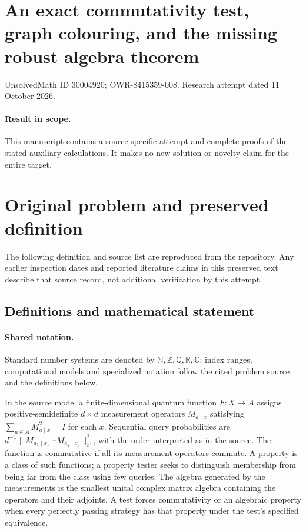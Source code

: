 \documentclass[11pt]{article}
\begin{document}
\section*{An exact commutativity test, graph colouring, and the missing robust algebra theorem}
\noindent UnsolvedMath ID 30004920; OWR-8415359-008. Research attempt dated 11 October 2026.
\paragraph{Result in scope.}This manuscript contains a source-specific attempt and complete proofs of the stated auxiliary calculations. It makes no new solution or novelty claim for the entire target.
\section{Original problem and preserved definition}
The following definition and source list are reproduced from the repository. Any earlier inspection dates and reported literature claims in this preserved text describe that source record, not additional verification by this attempt.
\subsection{Definitions and mathematical statement}

\paragraph{Shared notation.}Standard number systems are denoted by $\mathbb N,\mathbb Z,\mathbb Q,\mathbb R,\mathbb C$; index ranges, computational models and specialized notation follow the cited problem source and the definitions below.


In the source model a finite-dimensional quantum function $F:X\to A$ assigns positive-semidefinite $d\times d$ measurement operators $M_{a\mid x}$ satisfying $\sum_{a\in A}M_{a\mid x}^2=I$ for each $x$. Sequential query probabilities are $d^{-1}\|M_{a_1\mid x_1}\cdots M_{a_q\mid x_q}\|_{\mathrm F}^2$, with the order interpreted as in the source. The function is commutative if all its measurement operators commute. A property is a class of such functions; a property tester seeks to distinguish membership from being far from the class using few queries. The algebra generated by the measurements is the smallest unital complex matrix algebra containing the operators and their adjoints. A test forces commutativity or an algebraic property when every perfectly passing strategy has that property under the test's specified equivalence.
\end{document}
